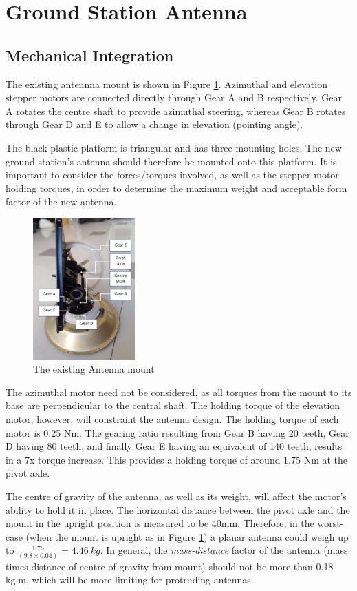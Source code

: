 \graphicspath{{./figures}}

\section{Ground Station Antenna}
\subsection{Mechanical Integration}

The existing antennna mount is shown in Figure \ref{fig:antennaMount}. Azimuthal and elevation stepper motors are connected directly through Gear A and B respectively. Gear A rotates the centre shaft to provide azimuthal steering, whereas Gear B rotates through Gear D and E to allow a change in elevation (pointing angle).

The black plastic platform is triangular and has three mounting holes. The new ground station's antenna should therefore be mounted onto this platform. It is important to consider the forces/torques involved, as well as the stepper motor holding torques, in order to determine the maximum weight and acceptable form factor of the new antenna.

\begin{figure}[!htb]
  \centering
  \includegraphics[width=0.35\textwidth]{antennaMount}
  \caption{The existing Antenna mount}
  \label{fig:antennaMount}
\end{figure}

The azimuthal motor need not be considered, as all torques from the mount to its base are perpendicular to the central shaft. The holding torque of the elevation motor, however, will constraint the antenna design. The holding torque of each motor is 0.25 Nm. The gearing ratio resulting from Gear B having 20 teeth, Gear D having 80 teeth, and finally Gear E having an equivalent of 140 teeth, results in a 7x torque increase. This provides a holding torque of around 1.75 Nm at the pivot axle.

The centre of gravity of the antenna, as well as its weight, will affect the motor's ability to hold it in place. The horizontal distance between the pivot axle and the mount in the upright position is measured to be 40mm. Therefore, in the worst-case (when the mount is upright as in Figure \ref{fig:antennaMount}) a planar antenna could weigh up to $\frac{1.75}{(9.8 \times 0.04)} = \SI{4.46}{kg}$. In general, the \textit{mass-distance} factor of the antenna (mass times distance of centre of gravity from mount) should not be more than 0.18 kg.m, which will be more limiting for protruding antennas.